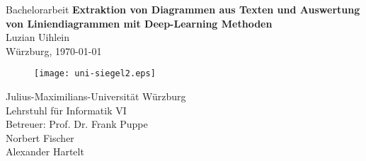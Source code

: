 \begin{titlepage}
    \centering \mbox{}
    \large Bachelorarbeit \vfill  \Huge \textbf{Extraktion von Diagrammen aus Texten und Auswertung von Liniendiagrammen mit Deep-Learning Methoden} \\ \vfill \vfill \Large Luzian Uihlein \\ \vfill Würzburg, \today \\ \vfill \begin{figure}[H] \begin{center} \texttt{[image: uni-siegel2.eps]}
        \end{center}
    \end{figure}

    Julius-Maximilians-Universität Würzburg \\
    Lehrstuhl für Informatik \RN{6}\\
    Betreuer: Prof. Dr. Frank Puppe\\
    \phantom{Betreuer: }Norbert Fischer\phantom{aaaaaa}\\
    \phantom{Betreuer: }Alexander Hartelt\phantom{aaaa}
\end{titlepage}

\thispagestyle{empty}
\cleardoublepage
